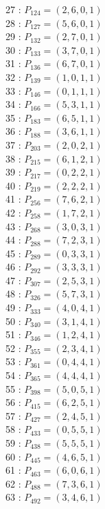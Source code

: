 \documentclass{article}
\begin{document}
{\begin{multicols}{3}
27 : $P_{124}=( 2, 6, 0, 1 )$\\
28 : $P_{127}=( 5, 6, 0, 1 )$\\
29 : $P_{132}=( 2, 7, 0, 1 )$\\
30 : $P_{133}=( 3, 7, 0, 1 )$\\
31 : $P_{136}=( 6, 7, 0, 1 )$\\
32 : $P_{139}=( 1, 0, 1, 1 )$\\
33 : $P_{146}=( 0, 1, 1, 1 )$\\
34 : $P_{166}=( 5, 3, 1, 1 )$\\
35 : $P_{183}=( 6, 5, 1, 1 )$\\
36 : $P_{188}=( 3, 6, 1, 1 )$\\
37 : $P_{203}=( 2, 0, 2, 1 )$\\
38 : $P_{215}=( 6, 1, 2, 1 )$\\
39 : $P_{217}=( 0, 2, 2, 1 )$\\
40 : $P_{219}=( 2, 2, 2, 1 )$\\
41 : $P_{256}=( 7, 6, 2, 1 )$\\
42 : $P_{258}=( 1, 7, 2, 1 )$\\
43 : $P_{268}=( 3, 0, 3, 1 )$\\
44 : $P_{288}=( 7, 2, 3, 1 )$\\
45 : $P_{289}=( 0, 3, 3, 1 )$\\
46 : $P_{292}=( 3, 3, 3, 1 )$\\
47 : $P_{307}=( 2, 5, 3, 1 )$\\
48 : $P_{326}=( 5, 7, 3, 1 )$\\
49 : $P_{333}=( 4, 0, 4, 1 )$\\
50 : $P_{340}=( 3, 1, 4, 1 )$\\
51 : $P_{346}=( 1, 2, 4, 1 )$\\
52 : $P_{355}=( 2, 3, 4, 1 )$\\
53 : $P_{361}=( 0, 4, 4, 1 )$\\
54 : $P_{365}=( 4, 4, 4, 1 )$\\
55 : $P_{398}=( 5, 0, 5, 1 )$\\
56 : $P_{415}=( 6, 2, 5, 1 )$\\
57 : $P_{427}=( 2, 4, 5, 1 )$\\
58 : $P_{433}=( 0, 5, 5, 1 )$\\
59 : $P_{438}=( 5, 5, 5, 1 )$\\
60 : $P_{445}=( 4, 6, 5, 1 )$\\
61 : $P_{463}=( 6, 0, 6, 1 )$\\
62 : $P_{488}=( 7, 3, 6, 1 )$\\
63 : $P_{492}=( 3, 4, 6, 1 )$\\

\end{multicols}}
\end{document}
